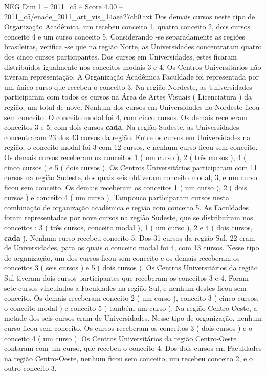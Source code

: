 \begin{textsample}{NEG Dim 1 – 2011\_c5 – Score 4.00 – 2011\_c5/enade\_2011\_art\_vis\_14aea27cb0.txt}
Dos demais cursos neste tipo de Organização Acadêmica, um recebeu conceito 1, quatro conceito 2, dois cursos conceito 4 e um curso conceito 5.
Considerando -se separadamente as regiões brasileiras, verifica -se que na região Norte, as Universidades concentraram quatro dos cinco cursos participantes.
Dos cursos em Universidades, estes ficaram distribuídos igualmente nos conceitos modais 3 e 4.
Os Centros Universitários não tiveram representação.
A Organização Acadêmica Faculdade foi representada por um único curso que recebeu o conceito 3.
Na região Nordeste, as Universidades participaram com todos os cursos na Área de Artes Visuais ( Licenciatura ) da região, um total de nove.
Nenhum dos cursos em Universidades no Nordeste ficou sem conceito.
O conceito modal foi 4, com cinco cursos.
Os demais receberam conceitos 3 e 5, com dois cursos \textbf{cada}.
Na região Sudeste, as Universidades concentraram 23 dos 43 cursos da região.
Entre os cursos em Universidades na região, o conceito modal foi 3 com 12 cursos, e nenhum curso ficou sem conceito.
Os demais cursos receberam os conceitos 1 ( um curso ), 2 ( três cursos ), 4 ( cinco cursos ) e 5 ( dois cursos ).
Os Centros Universitários participaram com 11 cursos na região Sudeste, dos quais seis obtiveram conceito modal, 3, e um curso ficou sem conceito.
Os demais receberam os conceitos 1 ( um curso ), 2 ( dois cursos ) e conceito 4 ( um curso ).
Tampouco participaram cursos nesta combinação de organização acadêmica e região com conceito 5.
As Faculdades foram representadas por nove cursos na região Sudeste, que se distribuíram nos conceitos : 3 ( três cursos, conceito modal ), 1 ( um curso ), 2 e 4 ( dois cursos, \textbf{cada} ).
Nenhum curso recebeu conceito 5.
Dos 31 cursos da região Sul, 22 eram de Universidades, para os quais o conceito modal foi 4, com 13 cursos.
Nesse tipo de organização, um dos cursos ficou sem conceito e os demais receberam os conceitos 3 ( seis cursos ) e 5 ( dois cursos ).
Os Centros Universitários da região Sul tiveram dois cursos participantes que receberam os conceitos 3 e 4.
Foram sete cursos vinculados a Faculdades na região Sul, e nenhum destes ficou sem conceito.
Os demais receberam conceito 2 ( um curso ), conceito 3 ( cinco cursos, o conceito modal ) e conceito 5 ( também um curso ).
Na região Centro-Oeste, a metade dos seis cursos eram de Universidades.
Nesse tipo de organização, nenhum curso ficou sem conceito.
Os cursos receberam os conceitos 3 ( dois cursos ) e o conceito 4 ( um curso ).
Os Centros Universitários da região Centro-Oeste contaram com um curso, que recebeu o conceito 4.
Dos dois cursos em Faculdades na região Centro-Oeste, nenhum ficou sem conceito, um recebeu conceito 2, e o outro conceito 3.

\end{textsample}
